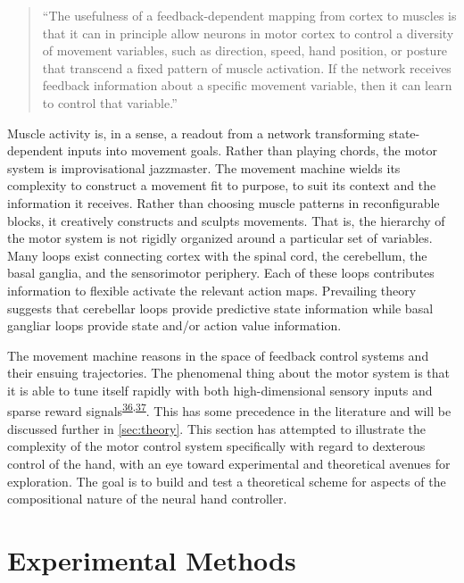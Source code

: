 \documentclass[
  a4paper,
]{article}
\begin{document}
\begin{quote}
``The usefulness of a feedback-dependent mapping from cortex to muscles
is that it can in principle allow neurons in motor cortex to control a
diversity of movement variables, such as direction, speed, hand
position, or posture that transcend a fixed pattern of muscle
activation. If the network receives feedback information about a
specific movement variable, then it can learn to control that
variable.''
\end{quote}

Muscle activity is, in a sense, a readout from a network transforming
state-dependent inputs into movement goals. Rather than playing chords,
the motor system is improvisational jazzmaster. The movement machine
wields its complexity to construct a movement fit to purpose, to suit
its context and the information it receives. Rather than choosing muscle
patterns in reconfigurable blocks, it creatively constructs and sculpts
movements. That is, the hierarchy of the motor system is not rigidly
organized around a particular set of variables. Many loops exist
connecting cortex with the spinal cord, the cerebellum, the basal
ganglia, and the sensorimotor periphery. Each of these loops contributes
information to flexible activate the relevant action maps. Prevailing
theory suggests that cerebellar loops provide predictive state
information while basal gangliar loops provide state and/or action value
information.

The movement machine reasons in the space of feedback control systems
and their ensuing trajectories. The phenomenal thing about the motor
system is that it is able to tune itself rapidly with both
high-dimensional sensory inputs and sparse reward
signals\textsuperscript{\protect\hyperlink{ref-bahlNeuralDynamicPoliciesfor2020}{36},\protect\hyperlink{ref-ijspeertDynamicalMovementPrimitives2013}{37}}.
This has some precedence in the literature and will be discussed further
in \cref{sec:theory}. This section has attempted to illustrate the
complexity of the motor control system specifically with regard to
dexterous control of the hand, with an eye toward experimental and
theoretical avenues for exploration. The goal is to build and test a
theoretical scheme for aspects of the compositional nature of the neural
hand controller.

\hypertarget{sec:experiment}{%
\section{Experimental Methods}\label{sec:experiment}}
\end{document}
